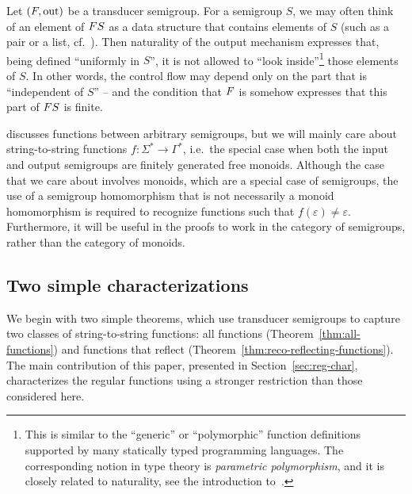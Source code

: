 \begin{remark}\label{rem:parametricity}
  Let $(\functor,\outfun)$ be a transducer semigroup. For a semigroup $S$, we
  may often think of an element of $\functor S$ as a data structure that
  contains elements of $S$ (such as a pair or a list, cf.~).
  Then naturality of the output mechanism expresses that, being defined
  \enquote{uniformly in $S$}, it is not allowed to \enquote{look
    inside}\footnote{This is similar to the \enquote{generic} or
    \enquote{polymorphic} function definitions supported by many statically
    typed programming languages. The corresponding notion in type theory is
    \emph{parametric polymorphism}, and it is closely related to naturality, see
    the introduction to~\cite{Parametricity}.} those elements of $S$. In other
  words, the control flow may depend only on the part that is
  \enquote{independent of $S$} -- and the condition that $\functor$ is
   somehow expresses that this part of $\functor S$ is
  finite.
\end{remark}

\begin{remark}
   discusses functions between arbitrary semigroups, but we will
  mainly care about string-to-string functions $f\colon \Sigma^* \to \Gamma^*$,
  i.e.~the special case when both the input and output semigroups are finitely
  generated free monoids. Although the case that we care about involves monoids,
  which are a special case of semigroups, the use of a semigroup homomorphism that
  is not necessarily a monoid homomorphism is required to recognize functions such
  that $f(\varepsilon)\neq\varepsilon$. Furthermore, it will be useful in the
  proofs to work in the category of semigroups, rather than the category of monoids.
\end{remark}

\subsection{Two simple characterizations}
\label{sec:two-simple}

We begin with two simple theorems, which use transducer semigroups to capture two classes of string-to-string functions: all functions (Theorem~\ref{thm:all-functions}) and functions that reflect  (Theorem~\ref{thm:reco-reflecting-functions}).
The main contribution of this paper, presented in Section~\ref{sec:reg-char},
characterizes the regular functions using a stronger restriction than those
considered here.

